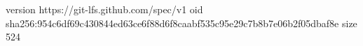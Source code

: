 version https://git-lfs.github.com/spec/v1
oid sha256:954c6df69c430844ed63ce6f88d6f8caabf535c95e29c7b8b7e06b2f05dbaf8e
size 524

